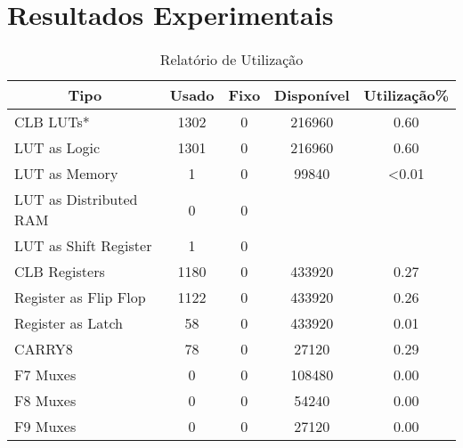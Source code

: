 \chapter{Resultados Experimentais}\label{CAP4}

\begin{table}[!htb]
   \centering
\caption{Relatório de Utilização}
\label{Tab:teste}
\begin{tabular}{lcccc}
	\hline
\multicolumn{1}{c}{Tipo}&\multicolumn{1}{c}{Usado}&\multicolumn{1}{c}{Fixo}&\multicolumn{1}{c}{Disponível}&\multicolumn{1}{c}{Utilização\%} \\ \midrule
 CLB LUTs*&  1302  & 0 & 216960 & 0.60  \\   \midrule
 LUT as Logic & 1301 & 0 & 216960 &  0.60  \\  \midrule
 LUT as Memory &  1 & 0 & 99840 &  <0.01  \\  \midrule
 LUT as Distributed RAM &0 & 0 &  &   \\  \midrule
 LUT as Shift Register & 1 & 0 &  &   \\  \midrule
 CLB Registers  & 1180 & 0 & 433920 & 0.27  \\  \midrule
 Register as Flip Flop & 1122 & 0  & 433920  &  0.26    \\  \midrule
 Register as Latch & 58 & 0 & 433920  &  0.01  \\  \midrule
 CARRY8 & 78 & 0 & 27120 & 0.29  \\  \midrule
 F7 Muxes &0 & 0 & 108480 &  0.00   \\  \midrule
 F8 Muxes & 0 &0 & 54240 &  0.00  \\  \midrule
 F9 Muxes & 0 & 0 & 27120 &  0.00 \\  \midrule
\end{tabular}
\end{table}

 




